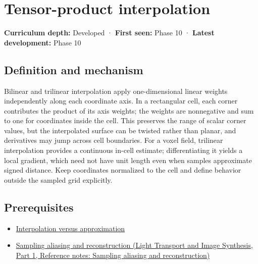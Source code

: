 \hypertarget{appendix-0a09b6dfdc86}{}\label{referencestart:appendix-0a09b6dfdc86}
\section{Tensor-product interpolation}\label{appendix-0a09b6dfdc86-tensor-product-interpolation}

\hypertarget{appendix-0a09b6dfdc86-tensor-product-interpolation}{}

\textbf{Curriculum depth:} Developed · \textbf{First seen:} Phase 10 · \textbf{Latest development:} Phase 10

\begin{allmightroledefinition}

\subsection{Definition and mechanism}\label{appendix-0a09b6dfdc86-definition-and-mechanism}

\hypertarget{appendix-0a09b6dfdc86-definition-and-mechanism}{}

Bilinear and trilinear interpolation apply one-dimensional linear weights independently along each coordinate axis. In a rectangular cell, each corner contributes the product of its axis weights; the weights are nonnegative and sum to one for coordinates inside the cell. This preserves the range of scalar corner values, but the interpolated surface can be twisted rather than planar, and derivatives may jump across cell boundaries. For a voxel field, trilinear interpolation provides a continuous in-cell estimate; differentiating it yields a local gradient, which need not have unit length even when samples approximate signed distance. Keep coordinates normalized to the cell and define behavior outside the sampled grid explicitly.

\end{allmightroledefinition}

\subsection{Prerequisites}\label{appendix-0a09b6dfdc86-prerequisites}

\hypertarget{appendix-0a09b6dfdc86-prerequisites}{}

\begin{itemize}
\tightlist
\item
  \hyperref[appendix-0c2a5f69851e]{Interpolation versus approximation}
\item
  \href{../04-Light-Transport-and-Image-Synthesis-P01/main.pdf\#nameddest=appendix-6a7869dd79a6}{Sampling aliasing and reconstruction (Light Transport and Image Synthesis, Part 1, Reference notes: Sampling aliasing and reconstruction)}
\end{itemize}

